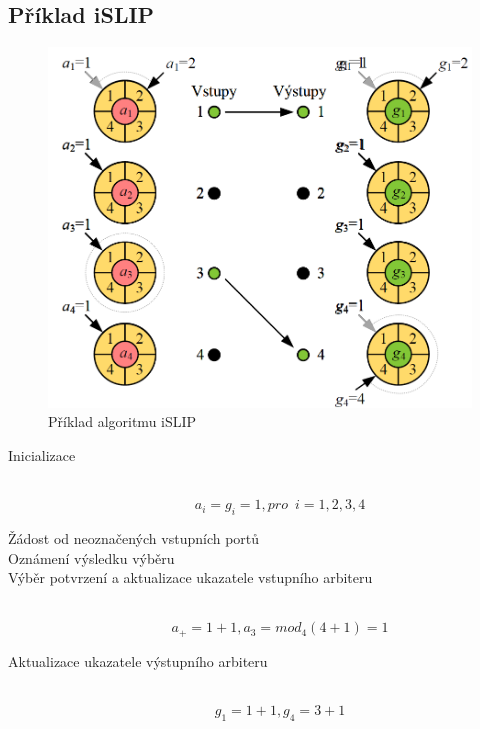 \subsection{Příklad iSLIP}
\begin{figure}[ht]
\centering
  \begin{center}
    \includegraphics[scale=0.5]{BPC-HWS/images/iSLIP_priklad.png}
  \end{center}
  \caption[Příklad algoritmu iSLIP]{Příklad algoritmu iSLIP}
\end{figure}
\begin{description}
  \item[Inicializace] \hfill \\
  \begin{equation}
      a_i = g_i = 1, pro \,\,\, i = 1, 2, 3, 4
  \end{equation}
  \item [Žádost od neoznačených vstupních portů] \hfill 
  \item [Oznámení výsledku výběru] \hfill 
  \item [Výběr potvrzení a aktualizace ukazatele vstupního arbiteru] \hfill \\
  \begin{equation}
    a_+ = 1 + 1, a_3 = mod_4{(4+1)} = 1
  \end{equation}
  \item [Aktualizace ukazatele výstupního arbiteru] \hfill \\
  \begin{equation}
      g_1 = 1 + 1, g_4 = 3 + 1
  \end{equation}
\end{description}
